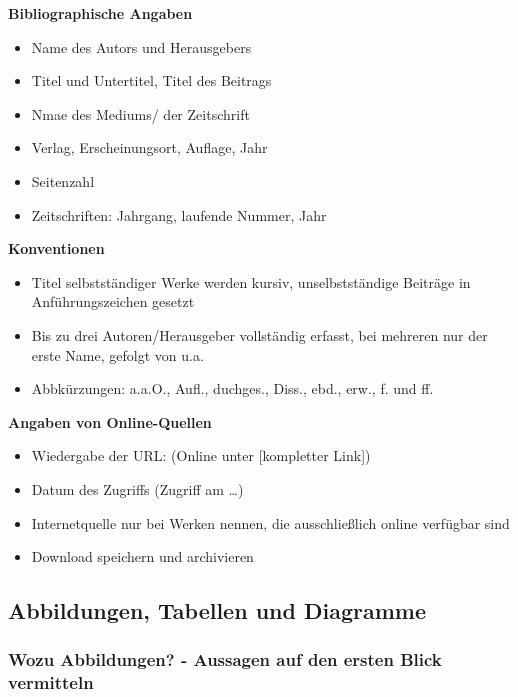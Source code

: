 \textbf{Bibliographische Angaben}

\begin{itemize}%
\item
  Name des Autors und Herausgebers
\item
  Titel und Untertitel, Titel des Beitrags
\item
  Nmae des Mediums/ der Zeitschrift
\item
  Verlag, Erscheinungsort, Auflage, Jahr
\item
  Seitenzahl
\item
  Zeitschriften: Jahrgang, laufende Nummer, Jahr
\end{itemize}

\textbf{Konventionen}

\begin{itemize}%
\item
  Titel selbstständiger Werke werden kursiv, unselbstständige Beiträge
  in Anführungszeichen gesetzt
\item
  Bis zu drei Autoren/Herausgeber vollständig erfasst, bei mehreren nur
  der erste Name, gefolgt von \frqq u.a.\flqq\,
\item
  Abbkürzungen: a.a.O., Aufl., duchges., Diss., ebd., erw., f. und ff.
\end{itemize}

\textbf{Angaben von Online-Quellen}

\begin{itemize}%
\item
  Wiedergabe der URL: (Online unter {[}kompletter Link{]})
\item
  Datum des Zugriffs (Zugriff am \ldots{})
\item
  Internetquelle nur bei Werken nennen, die ausschließlich online
  verfügbar sind
\item
  Download speichern und archivieren
\end{itemize}

\subsection{Abbildungen, Tabellen und
Diagramme}\label{abbildungen-tabellen-und-diagramme}

\subsubsection{\texorpdfstring{Wozu Abbildungen? - Aussagen \frqq auf den
ersten Blick\flqq\,
vermitteln}{Wozu Abbildungen? - Aussagen auf den ersten Blick vermitteln}}\label{wozu-abbildungen-aussagen-auf-den-ersten-blick-vermitteln}

